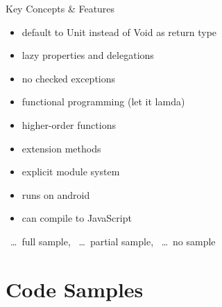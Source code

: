 \begin{frame}{Key Concepts \& Features}
	\begin{itemize}
		\item default to Unit instead of Void as return type \xmark 
		\item lazy properties and delegations \cmark
		\item no checked exceptions \xmark
		\item functional programming (let it lamda) \tmark
		\item higher-order functions \tmark
		\item extension methods \cmark
		\item explicit module system \xmark
		\item runs on android \xmark
		\item can compile to JavaScript \xmark
	\end{itemize}
\cmark\ \dots\ full sample, \tmark\ \dots\ partial sample, \xmark\ \dots\ no sample
\end{frame}

\section{Code Samples}

